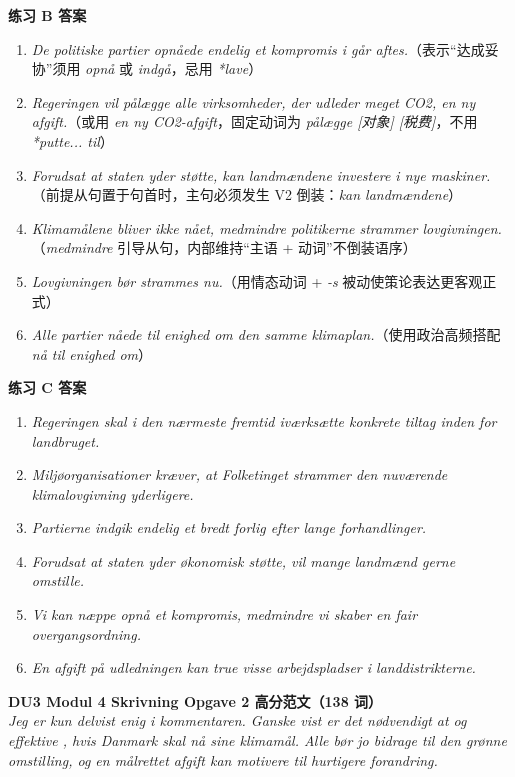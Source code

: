 \begin{answerbox}
\textbf{练习 B 答案}
\begin{enumerate}
  \item \textit{De politiske partier opnåede endelig et kompromis i går aftes.}（表示“达成妥协”须用 \textit{opnå} 或 \textit{indgå}，忌用 \textit{*lave}）
  \item \textit{Regeringen vil pålægge alle virksomheder, der udleder meget CO2, en ny afgift.}（或用 \textit{en ny CO2-afgift}，固定动词为 \textit{pålægge [对象] [税费]}，不用 \textit{*putte... til}）
  \item \textit{Forudsat at staten yder støtte, kan landmændene investere i nye maskiner.}（前提从句置于句首时，主句必须发生 V2 倒装：\textit{kan landmændene}）
  \item \textit{Klimamålene bliver ikke nået, medmindre politikerne strammer lovgivningen.}（\textit{medmindre} 引导从句，内部维持“主语 + 动词”不倒装语序）
  \item \textit{Lovgivningen bør strammes nu.}（用情态动词 + \textit{-s} 被动使策论表达更客观正式）
  \item \textit{Alle partier nåede til enighed om den samme klimaplan.}（使用政治高频搭配 \textit{nå til enighed om}）
\end{enumerate}

\textbf{练习 C 答案}
\begin{enumerate}
  \item \textit{Regeringen skal i den nærmeste fremtid iværksætte konkrete tiltag inden for landbruget.}
  \item \textit{Miljøorganisationer kræver, at Folketinget strammer den nuværende klimalovgivning yderligere.}
  \item \textit{Partierne indgik endelig et bredt forlig efter lange forhandlinger.}
  \item \textit{Forudsat at staten yder økonomisk støtte, vil mange landmænd gerne omstille.}
  \item \textit{Vi kan næppe opnå et kompromis, medmindre vi skaber en fair overgangsordning.}
  \item \textit{En afgift på udledningen kan true visse arbejdspladser i landdistrikterne.}
\end{enumerate}

\textbf{DU3 Modul 4 Skrivning Opgave 2 高分范文（138 词）}\\
\textit{Jeg er kun delvist enig i kommentaren. Ganske vist er det nødvendigt at  og  effektive , hvis Danmark skal nå sine klimamål. Alle bør jo bidrage til den grønne omstilling, og en målrettet afgift kan motivere til hurtigere forandring.}


\end{answerbox}
